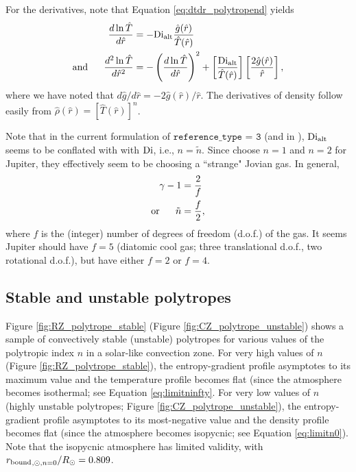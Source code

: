 \documentclass[12pt]{article}
\numberwithin{equation}{section}
\newcommand{\rbound}{r_{\rm{bound}}}
\newcommand{\dialt}{\di_{\rm{alt}}}
\begin{document}
For the derivatives, note that Equation \eqref{eq:dtdr_polytropend} yields
\begin{align}
	\frac{d\ln\hat{T}}{d\hat{r}} &= -\dialt \frac{\hat{g}(\hat{r})}{\hat{T}(\hat{r})}\\
	\andd \frac{d^2\ln\hat{T}}{d\hat{r}^2} &= -\left(\frac{d\ln\hat{T}}{d\hat{r}}\right)^2 + \left[\frac{\dialt}{\hat{T}(\hat{r})}\right] \left[\frac{2\hat{g}(\hat{r})}{\hat{r}} \right],
\end{align}
where we have noted that $d\hat{g}/d\hat{r}=-2\hat{g}(\hat{r})/\hat{r}$. The derivatives of density follow easily from $\hat{\rho}(\hat{r})=[\hat{T}(\hat{r})]^n$.

Note that in the current formulation of $\texttt{reference\_type = 3}$ (and in \citealt{Heimpel2022}), $\dialt$ seems to be conflated with with ${\rm{Di}}$, i.e., $n = \tilde{n}$. Since \citet{Heimpel2022} choose $n=1$ and $n=2$ for Jupiter, they effectively seem to be choosing a ``strange" Jovian gas. In general, 
\begin{subequations}
\begin{align}
	\gamma - 1 &= \frac{2}{f}\\
	\text{or}\ \ \ \ \  \tilde{n} &= \frac{f}{2},
\end{align}
\end{subequations}
where $f$ is the (integer) number of degrees of freedom (d.o.f.) of the gas. It seems Jupiter should have $f=5$ (diatomic cool gas; three translational d.o.f., two rotational d.o.f.), but \citet{Heimpel2022} have either $f=2$ or $f=4$. 

\subsection{Stable and unstable polytropes}
Figure \ref{fig:RZ_polytrope_stable} (Figure \ref{fig:CZ_polytrope_unstable}) shows a sample of convectively stable (unstable) polytropes for various values of the polytropic index $n$ in a solar-like convection zone. For very high values of $n$ (Figure \ref{fig:RZ_polytrope_stable}), the entropy-gradient profile asymptotes to its maximum value and the temperature profile becomes flat (since the atmosphere becomes isothermal; see Equation \eqref{eq:limitninfty}. For very low values of $n$ (highly unstable polytropes; Figure \ref{fig:CZ_polytrope_unstable}), the entropy-gradient profile asymptotes to its most-negative value and the density profile becomes flat (since the atmosphere becomes isopycnic; see Equation \eqref{eq:limitn0}). Note that the isopycnic atmosphere has limited validity, with ${\rbound}_{,\odot,n=0}/\rsun=0.809$. 
\end{document}
